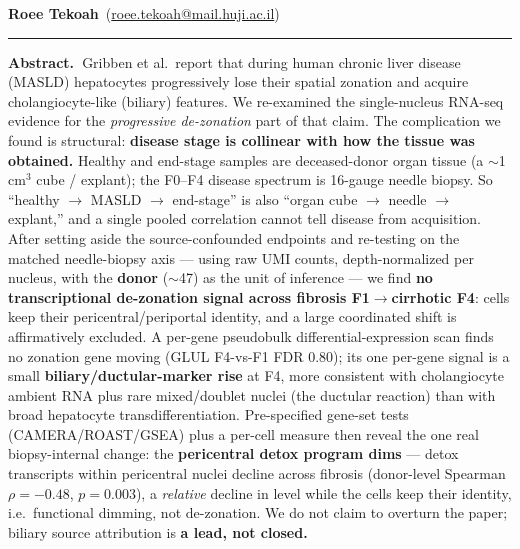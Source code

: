 \documentclass[11pt,a4paper]{article}
\begin{document}
\par
\vspace{0.45em}
\noindent\textbf{Roee Tekoah}~(\href{mailto:roee.tekoah@mail.huji.ac.il}{roee.tekoah@mail.huji.ac.il})\par
\vspace{0.12em}
\par
\vspace{0.45em}
\noindent\textcolor{black!40}{\rule{\textwidth}{0.7pt}}\par
\vspace{0.6em}

{\small\noindent\textbf{Abstract.~}Gribben et al.\ report that during human chronic liver disease (MASLD) hepatocytes progressively lose their spatial zonation and acquire cholangiocyte-like (biliary) features. We re-examined the single-nucleus RNA-seq evidence for the \emph{progressive de-zonation} part of that claim. The complication we found is structural: \textbf{disease stage is collinear with how the tissue was obtained.} Healthy and end-stage samples are deceased-donor organ tissue (a $\sim$1\,cm$^3$ cube / explant); the F0--F4 disease spectrum is 16-gauge needle biopsy. So ``healthy $\to$ MASLD $\to$ end-stage'' is also ``organ cube $\to$ needle $\to$ explant,'' and a single pooled correlation cannot tell disease from acquisition. After setting aside the source-confounded endpoints and re-testing on the matched needle-biopsy axis --- using raw UMI counts, depth-normalized per nucleus, with the \textbf{donor} ($\sim$47) as the unit of inference --- we find \textbf{no transcriptional de-zonation signal across fibrosis F1$\to$cirrhotic F4}: cells keep their pericentral/periportal identity, and a large coordinated shift is affirmatively excluded. A per-gene pseudobulk differential-expression scan finds no zonation gene moving (GLUL F4-vs-F1 FDR 0.80); its one per-gene signal is a small \textbf{biliary/ductular-marker rise} at F4, more consistent with cholangiocyte ambient RNA plus rare mixed/doublet nuclei (the ductular reaction) than with broad hepatocyte transdifferentiation. Pre-specified gene-set tests (CAMERA/ROAST/GSEA) plus a per-cell measure then reveal the one real biopsy-internal change: the \textbf{pericentral detox program dims} --- detox transcripts within pericentral nuclei decline across fibrosis (donor-level Spearman $\rho=-0.48$, $p=0.003$), a \emph{relative} decline in level while the cells keep their identity, i.e.\ functional dimming, not de-zonation. We do not claim to overturn the paper; biliary source attribution is \textbf{a lead, not closed.}}\par\vspace{0.5em}
\end{document}

